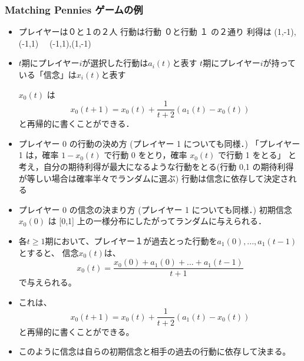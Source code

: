 \documentclass[dvipdfmx,fleqn]{beamer}
\begin{document}
\begin{frame}
\frametitle{Matching Pennies ゲームの例}
\begin{itemize}\setlength{\parskip}{0.5em}
\item

プレイヤーは０と１の２人
行動は行動 ０と行動 １ の２通り
利得は (1,-1),(-1,1)
     　(-1,1),(1,-1) 

\item
$t$期にプレイヤー$i$が選択した行動は$a_i(t)$と表す
$t$期にプレイヤー$i$が持っている「信念」は$x_i(t)$と表す
 \pause
 
$x_0(t)$ は
\[
x_0(t+1)
= x_0(t) + \frac{1}{t+2} (a_1(t) - x_0(t))
\]
と再帰的に書くことができる． \pause

\item
プレイヤー 0 の行動の決め方  (プレイヤー 1 についても同様．)
「プレイヤー 1 は，確率 $1−x_0(t)$ で行動 0 をとり，確率 $x_0(t)$ で行動 1 をとる」 と考え，自分の期待利得が最大になるような行動をとる(行動 0,1 の期待利得が等しい場合は確率半々でランダムに選ぶ)
行動は信念に依存して決定される
 \pause

\item
プレイヤー 0 の信念の決まり方  (プレイヤー 1 についても同様．)
初期信念 $x_0(0)$ は [0,1] 上の一様分布にしたがってランダムに与えられる．
 \item
 各$t\geq1$期において、プレイヤー１が過去とった行動を$a_1(0),...,a_1(t-1)$とすると、
 信念$x_0(t)$は、
 \[
 x_0(t)
 = \frac{x_0(0)+a_1(0)+...+a_1(t-1)}{t+1} 
 \]
 で与えられる。
 \item
 これは、
 \[
 x_0(t+1)
 = x_0(t) + \frac{1}{t+2} (a_1(t) - x_0(t))
 \]
 と再帰的に書くことができる。 \pause

\item
このように信念は自らの初期信念と相手の過去の行動に依存して決まる。

\end{itemize}
\end{frame}
\end{document}
